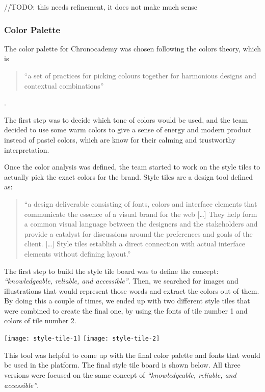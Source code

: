 //TODO: this needs refinement, it does not make much sense
\subsubsection{Color Palette}\label{subsubsec:color-palette}
The color palette for Chronocademy was chosen following the colors theory, which is

\begin{quote}
``a set of practices for picking colours together for harmonious designs and contextual combinations''
\end{quote}\cite{colorTheory}.

The first step was to decide which tone of colors would be used, and the team decided to use some warm colors to give a sense of energy and modern product instead of pastel colors, which are know for their calming and trustworthy interpretation.

Once the color analysis was defined, the team started to work on the style tiles to actually pick the exact colors for the brand.
Style tiles are a design tool defined as:

\begin{quote}
``a design deliverable consisting of fonts, colors and interface elements that communicate the essence of a visual brand for the web
[\ldots]
They help form a common visual language between the designers and the stakeholders and provide a catalyst for discussions around the preferences and goals of the client.
[\ldots]
Style tiles establish a direct connection with actual interface elements without defining layout.''
\end{quote}\cite{styleTiles}

The first step to build the style tile board was to define the concept: \textit{``knowledgeable, reliable, and accessible''}.
Then, we searched for images and illustrations that would represent those words and extract the colors out of them.
By doing this a couple of times, we ended up with two different style tiles that were combined to create the final one, by using the fonts of tile number 1 and colors of tile number 2.\newline

\texttt{[image: style-tile-1]}\newline
\texttt{[image: style-tile-2]}\newline

This tool was helpful to come up with the final color palette and fonts that would be used in the platform.
The final style tile board is shown below.
All three versions were focused on the same concept of \textit{``knowledgeable, reliable, and accessible''}.\newline

